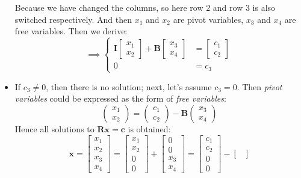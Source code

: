 \begin{itemize}
Because we have changed the columns, so here row $2$ and row $3$ is also switched respectively. And then $x_1$ and $x_2$ are pivot variables, $x_3$ and $x_4$ are free variables. Then we derive:
\[
\implies
\left\{\begin{aligned}
\bm I\begin{bmatrix}
x_1\\x_2
\end{bmatrix}+ \bm B\begin{bmatrix}
x_3\\x_4
\end{bmatrix} &= \begin{bmatrix}
c_1\\c_2
\end{bmatrix}\\
0 &= c_3
\end{aligned}\right.
\]
\item
If $c_3\ne 0$, then there is no solution; next, let's assume $c_3=0$. Then \textit{pivot variables} could be expressed as the form of \textit{free variables}:
\[
\begin{pmatrix}
x_1\\x_2
\end{pmatrix} = \begin{pmatrix}
c_1\\c_2
\end{pmatrix} - \bm B\begin{pmatrix}
x_3\\x_4
\end{pmatrix}
\]
Hence all solutions to $\bm{Rx} = \bm c$ is obtained:
\[
\bm x = \begin{bmatrix}
x_1\\x_2\\x_3\\x_4
\end{bmatrix} = \begin{bmatrix}
x_1\\x_2\\0\\0
\end{bmatrix} + \begin{bmatrix}
0\\0\\x_3\\x_4
\end{bmatrix} = 
\begin{bmatrix}
c_1\\c_2\\0\\0
\end{bmatrix} - \begin{bmatrix}

\end{bmatrix}\]
\end{itemize}
